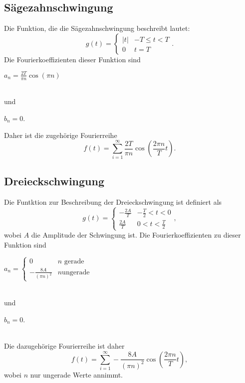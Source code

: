    \subsection{Sägezahnschwingung}
    Die Funktion, die die Sägezahnschwingung beschreibt lautet:
    \begin{equation}
    \label{eqn:saegezahn}
    g(t) = \begin{cases}
            \lvert t \rvert & -T \leq t < T \\
            0 & t = T 
            \end{cases}.
    \end{equation}
    Die Fourierkoeffizienten dieser Funktion sind
    \\ 
    \centerline{$a_n = \frac{2T}{\pi n} \cos(\pi n)$}
    \\
    und 
    \\ 
    \centerline{$b_n = 0$.}
    Daher ist die zugehörige Fourierreihe
    \begin{equation}
    \label{eqn:fouriersäge} 
    f(t) = \sum_{i=1}^{\infty} \frac{2 T}{\pi n} \cos(\frac{ 2 \pi n}{T}t).
    \end{equation}

    \subsection{Dreieckschwingung}
    Die Funtktion zur Beschreibung der Dreieckschwingung ist definiert als
    \begin{equation}
    \label{eqn:dreieck}
    g(t) = \begin{cases} 
            - \frac {2 A} {T} & - \frac {T}{2} < t < 0 \\
            \frac {2 A} {T} & 0 < t < \frac {T}{2}
            \end{cases},
    \end{equation}
    wobei $A$ die Amplitude der Schwingung ist.
    Die Fourierkoeffizienten zu dieser Funktion sind
    \\
    \centerline{$a_n = \begin{cases}
                        0 & n \text{ gerade} \\
                        - \frac{8 A}{(\pi n)^2} & n \text{ungerade} \end{cases}$}
                        \\
    und   
    \\         
    \centerline{$b_n = 0$.} 
    \\      
    Die dazugehörige Fourierreihe ist daher
    \begin{equation}
    \label{eqn:fourierdrei}
    f(t) = \sum_{i=1}^{\infty} - \frac{8 A}{(\pi n)^2} \cos(\frac{2 \pi n}{T}t),    
    \end{equation}
    wobei $n$ nur ungerade Werte annimmt.
 

